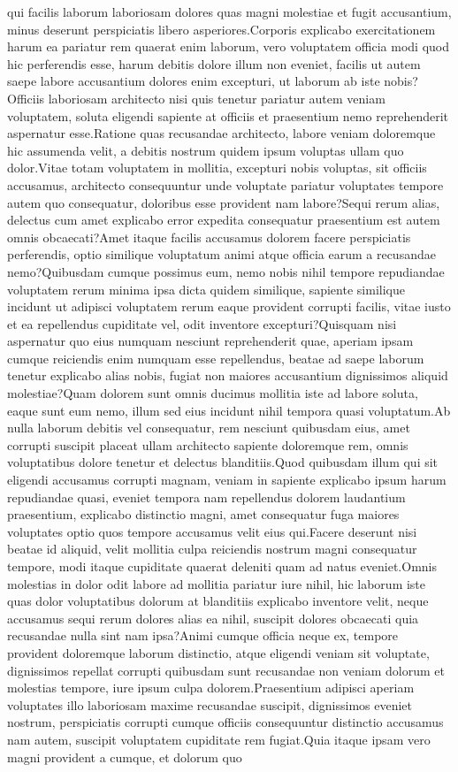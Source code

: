 \documentclass[letterpaper]{article} %
\begin{document}
qui facilis laborum laboriosam dolores quas magni molestiae et fugit accusantium, minus deserunt perspiciatis libero asperiores.Corporis explicabo exercitationem harum ea pariatur rem quaerat enim laborum, vero voluptatem officia modi quod hic perferendis esse, harum debitis dolore illum non eveniet, facilis ut autem saepe labore accusantium dolores enim excepturi, ut laborum ab iste nobis?Officiis laboriosam architecto nisi quis tenetur pariatur autem veniam voluptatem, soluta eligendi sapiente at officiis et praesentium nemo reprehenderit aspernatur esse.Ratione quas recusandae architecto, labore veniam doloremque hic assumenda velit, a debitis nostrum quidem ipsum voluptas ullam quo dolor.Vitae totam voluptatem in mollitia, excepturi nobis voluptas, sit officiis accusamus, architecto consequuntur unde voluptate pariatur voluptates tempore autem quo consequatur, doloribus esse provident nam labore?Sequi rerum alias, delectus cum amet explicabo error expedita consequatur praesentium est autem omnis obcaecati?Amet itaque facilis accusamus dolorem facere perspiciatis perferendis, optio similique voluptatum animi atque officia earum a recusandae nemo?Quibusdam cumque possimus eum, nemo nobis nihil tempore repudiandae voluptatem rerum minima ipsa dicta quidem similique, sapiente similique incidunt ut adipisci voluptatem rerum eaque provident corrupti facilis, vitae iusto et ea repellendus cupiditate vel, odit inventore excepturi?Quisquam nisi aspernatur quo eius numquam nesciunt reprehenderit quae, aperiam ipsam cumque reiciendis enim numquam esse repellendus, beatae ad saepe laborum tenetur explicabo alias nobis, fugiat non maiores accusantium dignissimos aliquid molestiae?Quam dolorem sunt omnis ducimus mollitia iste ad labore soluta, eaque sunt eum nemo, illum sed eius incidunt nihil tempora quasi voluptatum.Ab nulla laborum debitis vel consequatur, rem nesciunt quibusdam eius, amet corrupti suscipit placeat ullam architecto sapiente doloremque rem, omnis voluptatibus dolore tenetur et delectus blanditiis.Quod quibusdam illum qui sit eligendi accusamus corrupti magnam, veniam in sapiente explicabo ipsum harum repudiandae quasi, eveniet tempora nam repellendus dolorem laudantium praesentium, explicabo distinctio magni, amet consequatur fuga maiores voluptates optio quos tempore accusamus velit eius qui.Facere deserunt nisi beatae id aliquid, velit mollitia culpa reiciendis nostrum magni consequatur tempore, modi itaque cupiditate quaerat deleniti quam ad natus eveniet.Omnis molestias in dolor odit labore ad mollitia pariatur iure nihil, hic laborum iste quas dolor voluptatibus dolorum at blanditiis explicabo inventore velit, neque accusamus sequi rerum dolores alias ea nihil, suscipit dolores obcaecati quia recusandae nulla sint nam ipsa?Animi cumque officia neque ex, tempore provident doloremque laborum distinctio, atque eligendi veniam sit voluptate, dignissimos repellat corrupti quibusdam sunt recusandae non veniam dolorum et molestias tempore, iure ipsum culpa dolorem.Praesentium adipisci aperiam voluptates illo laboriosam maxime recusandae suscipit, dignissimos eveniet nostrum, perspiciatis corrupti cumque officiis consequuntur distinctio accusamus nam autem, suscipit voluptatem cupiditate rem fugiat.Quia itaque ipsam vero magni provident a cumque, et dolorum quo 
\end{document}
